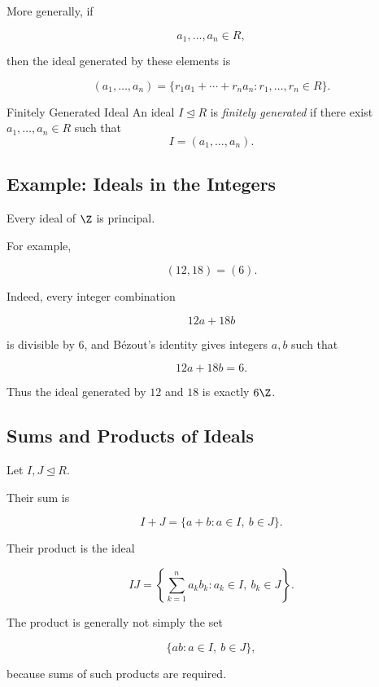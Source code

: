More generally, if

\[ a_1,\ldots,a_n\in R, \]

then the ideal generated by these elements is

\[ (a_1,\ldots,a_n)
=\{r_1a_1+\cdots+r_na_n:r_1,\ldots,r_n\in R\}. \]

\begin{definitionbox}{Finitely Generated Ideal}
An ideal \(I\trianglelefteq R\) is \emph{finitely generated} if there exist
\(a_1,\ldots,a_n\in R\) such that
\[ I=(a_1,\ldots,a_n). \]
\end{definitionbox}

\subsection{Example: Ideals in the Integers}
\label{subsec:ideals-in-integers}

Every ideal of \(\Z\) is principal.

For example,

\[ (12,18)=(6). \]

Indeed, every integer combination

\[ 12a+18b \]

is divisible by \(6\), and B\'ezout's identity gives integers \(a,b\) such
that

\[ 12a+18b=6. \]

Thus the ideal generated by \(12\) and \(18\) is exactly \(6\Z\).

\subsection{Sums and Products of Ideals}
\label{subsec:sums-products-ideals}

Let \(I,J\trianglelefteq R\).

Their sum is

\[ I+J=\{a+b:a\in I,\ b\in J\}. \]

Their product is the ideal

\[ IJ=\left\{\sum_{k=1}^{n}a_kb_k:a_k\in I,\ b_k\in J\right\}. \]

The product is generally not simply the set

\[ \{ab:a\in I,\ b\in J\}, \]

because sums of such products are required.

